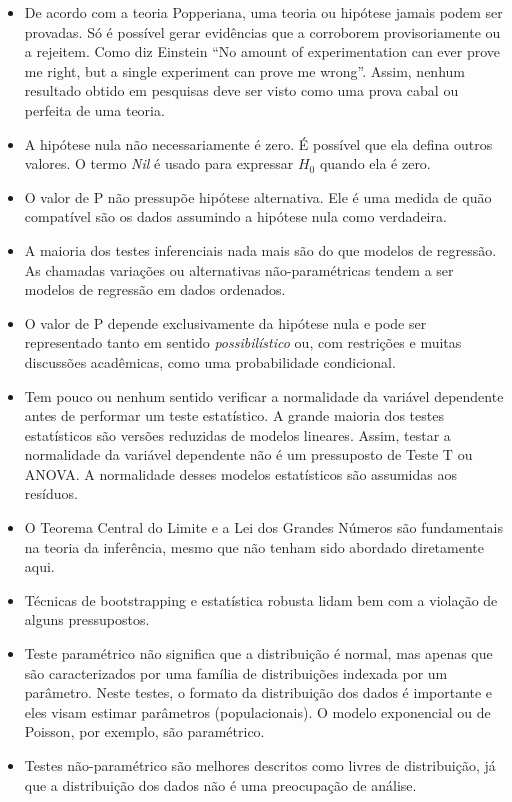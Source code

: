 \documentclass[
]{book}
\begin{document}
\begin{itemize}
\item
  De acordo com a teoria Popperiana, uma teoria ou hipótese jamais podem
  ser provadas. Só é possível gerar evidências que a corroborem
  provisoriamente ou a rejeitem. Como diz Einstein ``No amount of
  experimentation can ever prove me right, but a single experiment can
  prove me wrong''. Assim, nenhum resultado obtido em pesquisas deve ser
  visto como uma prova cabal ou perfeita de uma teoria.
\item
  A hipótese nula não necessariamente é zero. É possível que ela defina
  outros valores. O termo \emph{Nil} é usado para expressar \(H_0\)
  quando ela é zero.
\item
  O valor de P não pressupõe hipótese alternativa. Ele é uma medida de
  quão compatível são os dados assumindo a hipótese nula como
  verdadeira.
\item
  A maioria dos testes inferenciais nada mais são do que modelos de
  regressão. As chamadas variações ou alternativas não-paramétricas
  tendem a ser modelos de regressão em dados ordenados.
\item
  O valor de P depende exclusivamente da hipótese nula e pode ser
  representado tanto em sentido \emph{possibilístico} ou, com restrições
  e muitas discussões acadêmicas, como uma probabilidade condicional.
\item
  Tem pouco ou nenhum sentido verificar a normalidade da variável
  dependente antes de performar um teste estatístico. A grande maioria
  dos testes estatísticos são versões reduzidas de modelos lineares.
  Assim, testar a normalidade da variável dependente não é um
  pressuposto de Teste T ou ANOVA. A normalidade desses modelos
  estatísticos são assumidas aos resíduos.
\item
  O Teorema Central do Limite e a Lei dos Grandes Números são
  fundamentais na teoria da inferência, mesmo que não tenham sido
  abordado diretamente aqui.
\item
  Técnicas de bootstrapping e estatística robusta lidam bem com a
  violação de alguns pressupostos.
\item
  Teste paramétrico não significa que a distribuição é normal, mas
  apenas que são caracterizados por uma família de distribuições
  indexada por um parâmetro. Neste testes, o formato da distribuição dos
  dados é importante e eles visam estimar parâmetros (populacionais). O
  modelo exponencial ou de Poisson, por exemplo, são paramétrico.
\item
  Testes não-paramétrico são melhores descritos como livres de
  distribuição, já que a distribuição dos dados não é uma preocupação de
  análise.
\end{itemize}
\end{document}
